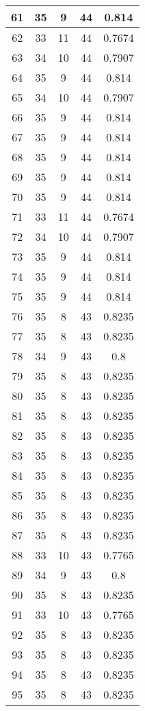 \documentclass[letterpaper, 12pt]{article}
\begin{document}
\begin{longtable}{|c|c|c|c|c|}
\hline
61 & 35 & 9 & 44 & 0.814 \\
\hline
62 & 33 & 11 & 44 & 0.7674 \\
\hline
63 & 34 & 10 & 44 & 0.7907 \\
\hline
64 & 35 & 9 & 44 & 0.814 \\
\hline
65 & 34 & 10 & 44 & 0.7907 \\
\hline
66 & 35 & 9 & 44 & 0.814 \\
\hline
67 & 35 & 9 & 44 & 0.814 \\
\hline
68 & 35 & 9 & 44 & 0.814 \\
\hline
69 & 35 & 9 & 44 & 0.814 \\
\hline
70 & 35 & 9 & 44 & 0.814 \\
\hline
71 & 33 & 11 & 44 & 0.7674 \\
\hline
72 & 34 & 10 & 44 & 0.7907 \\
\hline
73 & 35 & 9 & 44 & 0.814 \\
\hline
74 & 35 & 9 & 44 & 0.814 \\
\hline
75 & 35 & 9 & 44 & 0.814 \\
\hline
76 & 35 & 8 & 43 & 0.8235 \\
\hline
77 & 35 & 8 & 43 & 0.8235 \\
\hline
78 & 34 & 9 & 43 & 0.8 \\
\hline
79 & 35 & 8 & 43 & 0.8235 \\
\hline
80 & 35 & 8 & 43 & 0.8235 \\
\hline
81 & 35 & 8 & 43 & 0.8235 \\
\hline
82 & 35 & 8 & 43 & 0.8235 \\
\hline
83 & 35 & 8 & 43 & 0.8235 \\
\hline
84 & 35 & 8 & 43 & 0.8235 \\
\hline
85 & 35 & 8 & 43 & 0.8235 \\
\hline
86 & 35 & 8 & 43 & 0.8235 \\
\hline
87 & 35 & 8 & 43 & 0.8235 \\
\hline
88 & 33 & 10 & 43 & 0.7765 \\
\hline
89 & 34 & 9 & 43 & 0.8 \\
\hline
90 & 35 & 8 & 43 & 0.8235 \\
\hline
91 & 33 & 10 & 43 & 0.7765 \\
\hline
92 & 35 & 8 & 43 & 0.8235 \\
\hline
93 & 35 & 8 & 43 & 0.8235 \\
\hline
94 & 35 & 8 & 43 & 0.8235 \\
\hline
95 & 35 & 8 & 43 & 0.8235 \\

\end{longtable}
\end{document}
